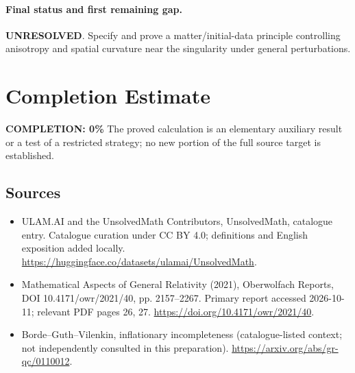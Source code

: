 \documentclass[11pt]{article}
\begin{document}
\paragraph{Final status and first remaining gap.}
\textbf{UNRESOLVED}. Specify and prove a matter/initial-data principle controlling anisotropy and spatial curvature near the singularity under general perturbations.

\section{Completion Estimate}
\noindent\textbf{COMPLETION: 0\%}
The proved calculation is an elementary auxiliary result or a test of a restricted strategy; no new portion of the full source target is established.

\subsection{Sources}
\begin{itemize}
\item[\hypertarget{source:statement:1}{S1}] ULAM.AI and the UnsolvedMath Contributors, UnsolvedMath, catalogue entry. Catalogue curation under CC BY 4.0; definitions and English exposition added locally.
\url{https://huggingface.co/datasets/ulamai/UnsolvedMath}.
\item[\hypertarget{source:statement:2}{S2}] Mathematical Aspects of General Relativity (2021), Oberwolfach Reports, DOI 10.4171/owr/2021/40, pp. 2157--2267. Primary report accessed 2026-10-11; relevant PDF pages 26, 27.
\url{https://doi.org/10.4171/owr/2021/40}.
\item[\hypertarget{source:statement:3}{S3}] Borde--Guth--Vilenkin, inflationary incompleteness (catalogue-listed context; not independently consulted in this preparation).
\url{https://arxiv.org/abs/gr-qc/0110012}.
\end{itemize}
\label{end:statement}
\end{document}
